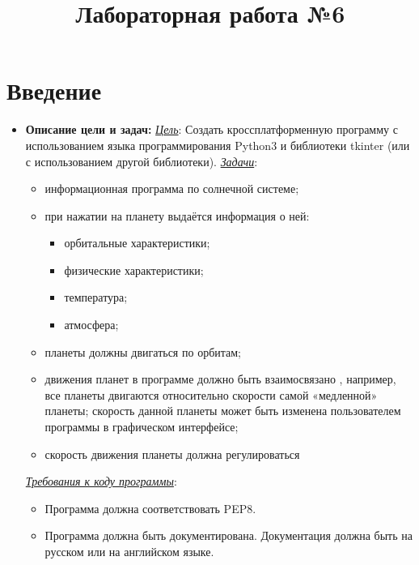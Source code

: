 \documentclass[14pt, oneside]{altsu-report}
\title{Лабораторная работа №6}
\institute{Институт цифровых технологий, электроники и физики}
\date{\the\year}
\begin{document}
\maketitle

\setcounter{page}{2}
\makeabstract
\tableofcontents

\chapter*{Введение}
\begin{itemize}
    \item \textbf{Описание цели и задач: \newline}
\underline{\textit{Цель}}: Создать кроссплатформенную программу с использованием языка программирования Python3 и библиотеки tkinter (или с использованием другой библиотеки). \newline
\underline{\textit{Задачи}}:

    \begin{itemize}
        \item информационная программа по солнечной системе;
        \item при нажатии на планету выдаётся информация о ней:
            \begin{itemize}
                \item орбитальные характеристики;
                \item физические характеристики;
                \item температура;
                \item атмосфера;
            \end{itemize}
        \item планеты должны двигаться по орбитам;
        \item движения планет в программе должно быть взаимосвязано , например, все планеты двигаются относительно скорости самой «медленной» планеты; скорость данной планеты может быть изменена пользователем программы в графическом интерфейсе;
        \item скорость движения планеты должна регулироваться
    \end{itemize}

\underline{\textit{Требования к коду программы}}:
    \begin{itemize}
        \item Программа должна соответствовать PEP8.
        \item Программа должна быть документирована. Документация должна быть на русском или на английском языке.
    \end{itemize}


\end{itemize}
\end{document}
